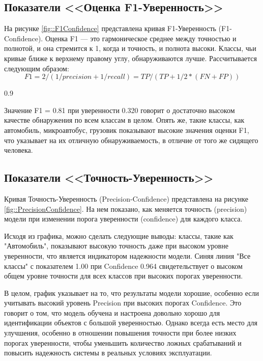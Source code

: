 \subsection{Показатели <<Оценка F1-Уверенность>>}

На рисунке \ref{fig::F1Confidence} представлена кривая F1-Уверенность (F1-
Confidence). Оценка F1 — это гармоническое среднее между точностью и полнотой, и
она стремится к 1, когда и точность, и полнота высоки. Классы, чьи кривые ближе к
верхнему правому углу, обнаруживаются лучше. Рассчитывается следующим образом:
\[ F1 = 2/(1/precision + 1/recall) = TP/(TP+1/2*(FN+FP))\]

{0.9}

Значение F1 = 0.81 при уверенности 0.320 говорит о достаточно высоком качестве 
обнаружения по всем классам в целом. Опять же, такие классы, как автомобиль,
микроавтобус, грузовик показывают высокие значения оценки F1, что указывает на их
отличную обнаруживаемость, в отличие от того же сидящего человека.

\subsection{Показатели <<Точность-Уверенность>>}

Кривая Точность-Уверенность (Precision-Confidence) представлена на рисунке 
\ref{fig::PrecisionConfidence}. На нем показано, как меняется точность (precision)
модели при изменении порога уверенности (confidence) для каждого класса.


Исходя из графика, можно сделать следующие выводы: классы, такие как "Автомобиль",
показывают высокую точность даже при высоком уровне уверенности, что является
индикатором надежности модели. Синяя линия "Все классы" с показателем 1.00 при
Confidence 0.964 свидетельствует о высоком общем уровне точности для всех классов
при высоких порогах уверенности.

В целом, график указывает на то, что результаты модели хорошие, особенно если учитывать
высокий уровень Precision при высоких порогах Confidence. Это говорит о том, что модель
обучена и настроена довольно хорошо для идентификации объектов с большой уверенностью.
Однако всегда есть место для улучшения, особенно в отношении повышения точности при более
низких порогах уверенности, чтобы уменьшить количество ложных срабатываний и повысить
надежность системы в реальных условиях эксплуатации.

